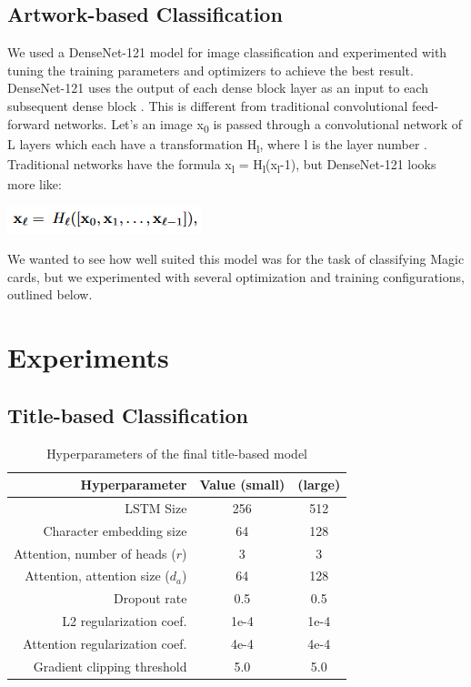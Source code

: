 \documentclass[letterpaper]{article} %
\begin{document}
\subsection{Artwork-based Classification}

We used a DenseNet-121 model for image classification and experimented with
tuning the training parameters and optimizers to achieve the best result.
DenseNet-121 uses the output of each dense block layer as an input to each
subsequent dense block \cite{huang2017densely}.
This is different from traditional convolutional feed-forward networks.
Let’s an image x\textsubscript{0} is passed through a
convolutional network of L layers which each have a transformation H\textsubscript{l},
where l is the layer number \cite{huang2017densely}.
Traditional networks have the formula
x\textsubscript{l} = H\textsubscript{l}(x\textsubscript{l}-1),
but DenseNet-121 looks more like:

\begin{center}
  \includegraphics[width=.3\textwidth]{densenet-formula}
\end{center}

We wanted to see how well suited this model was for the task of classifying Magic cards,
but we experimented with several optimization and training configurations,
outlined below.

\section{Experiments}


\subsection{Title-based Classification}

\begin{table}
  \centering
  \caption{Hyperparameters of the final title-based model}
  \begin{tabular}{r | c | c}
    Hyperparameter & Value (small) & (large) \\
    \hline
    LSTM Size & 256 & 512 \\
    Character embedding size & 64 & 128 \\
    Attention, number of heads ($r$) & 3 & 3\\
    Attention, attention size ($d_a$) & 64 & 128\\
    Dropout rate & 0.5 & 0.5 \\
    L2 regularization coef. & 1e-4 & 1e-4 \\
    Attention regularization coef. & 4e-4 & 4e-4 \\
    Gradient clipping threshold & 5.0 & 5.0 \\
  \end{tabular}
\end{table}
\end{document}
